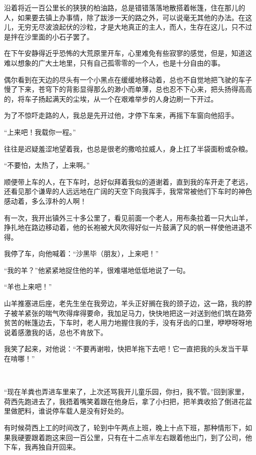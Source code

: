 \par 沿着将近一百公里长的狭狭的柏油路，总是错错落落地散搭着帐篷，住在那儿的人，如果要去镇上办事情，除了跋涉一天的路之外，可以说毫无其他的办法。在这儿，无穷无尽波浪起伏的沙粒，才是大地真正的主人，而人，生存在这儿，只不过是拌在沙里面的小石子罢了。
\par 在下午安静得近乎恐怖的大荒原里开车，心里难免有些寂寥的感觉，但是，知道这难以想象的广大土地里，只有自己孤零零的一个人，也是十分自由的事。
\par 偶尔看到在天边的尽头有一个小黑点在缓缓地移动着，总也不自觉地把飞驶的车子慢了下来，苍穹下的背影显得那么的渺小而单薄，总也忍不下心来，把头扬得高高的，将车子扬起满天的尘埃，从一个在艰难举步的人身边刷一下开过。
\par 为了不惊吓走路的人，我总是先开过他，才停下车来，再摇下车窗向他招手。
\par “上来吧！我载你一程。”
\par 往往是迟疑羞涩地望着我，也总是很老的撒哈拉威人，身上扛了半袋面粉或杂粮。
\par “不要怕，太热了，上来啊。”
\par 顺便带上车的人，在下车时，总好似拜着我似的道谢着，直到我的车开走了老远，还看见那个谦卑的人远远地在广阔的天空下向我挥手，我常常被他们下车时的神色感动着，多么淳朴的人啊！
\par 有一次，我开出镇外三十多公里了，看见前面一个老人，用布条拉着一只大山羊，挣扎地在路边移动着，他的长袍被大风吹得好似一片鼓满了风的帆一样使他进退不得。
\par 我停了车，向他喊着：“沙黑毕（朋友），上来吧！”
\par “我的羊？”他紧紧地捉住他的羊，很难堪地低低地说了一句。
\par “羊也上来吧！”
\par 山羊推塞进后座，老先生坐在我旁边，羊头正好搁在我的颈子边，这一路，我的脖子被羊紧张的喘气吹得痒得要命，我加足马力，快快地把这一对送到他们筑在路旁贫苦的帐篷边去，下车时，老人用力地握住我的手，没有牙齿的口里，咿咿呀呀地说着感激我的话，总也不肯放下。
\par 我笑了起来，对他说：“不要再谢啦，快把羊拖下去吧！它一直把我的头发当干草在啃哪！”
\par  
\par “现在羊粪也弄进车里来了，上次还骂我开儿童乐园，你扫，我不管。”回到家里，荷西先跑进去了，我捂着嘴笑着跟在他身后，拿了小扫把，把羊粪收拾了倒进花盆里做肥料，谁说停车载人是没有好处的。
\par 有时候荷西上工的时间改了，轮到中午两点上班，晚上十点下班，那种情形下，如果我硬要跟着跑这来回一百公里，只有在十二点半左右跟着他出门，到了公司，他下车，我再独自开回来。
